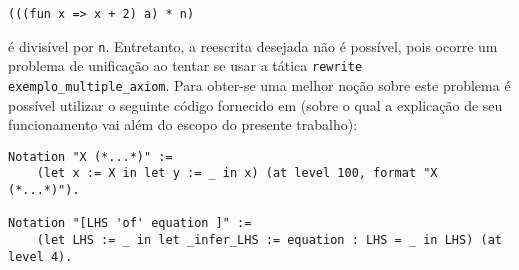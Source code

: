 {{    \begin{lstlisting}[language = coq,frame=single,tabsize=1]
(((fun x => x + 2) a) * n)
    \end{lstlisting} 
é divisível por \lstinline[language = coq]!n!. Entretanto, a reescrita desejada não é possível, pois ocorre um problema de unificação ao tentar se usar a tática \lstinline[language = coq]!rewrite exemplo_multiple_axiom!. Para obter-se uma melhor noção sobre este problema é possível utilizar o seguinte código fornecido em \cite{assia_mahboubi_2022_7118596} (sobre o qual a explicação de seu funcionamento vai além do escopo do presente trabalho):

    \begin{lstlisting}[language = coq,frame=single,tabsize=1]
Notation "X (*...*)" :=
    (let x := X in let y := _ in x) (at level 100, format "X  (*...*)").

Notation "[LHS 'of' equation ]" := 
    (let LHS := _ in let _infer_LHS := equation : LHS = _ in LHS) (at level 4).


\end{lstlisting}}}
